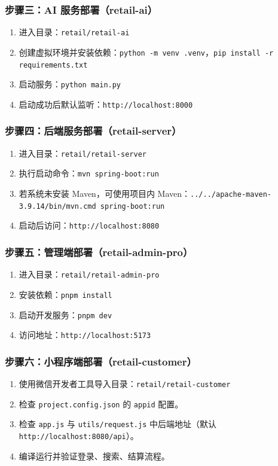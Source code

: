 \subsubsection{步骤三：AI 服务部署（retail-ai）}
\begin{enumerate}[leftmargin=2em]
  \item 进入目录：\texttt{retail/retail-ai}
  \item 创建虚拟环境并安装依赖：\texttt{python -m venv .venv}，\texttt{pip install -r requirements.txt}
  \item 启动服务：\texttt{python main.py}
  \item 启动成功后默认监听：\texttt{http://localhost:8000}
\end{enumerate}

\subsubsection{步骤四：后端服务部署（retail-server）}
\begin{enumerate}[leftmargin=2em]
  \item 进入目录：\texttt{retail/retail-server}
  \item 执行启动命令：\texttt{mvn spring-boot:run}
  \item 若系统未安装 Maven，可使用项目内 Maven：\texttt{../../apache-maven-3.9.14/bin/mvn.cmd spring-boot:run}
  \item 启动后访问：\texttt{http://localhost:8080}
\end{enumerate}

\subsubsection{步骤五：管理端部署（retail-admin-pro）}
\begin{enumerate}[leftmargin=2em]
  \item 进入目录：\texttt{retail/retail-admin-pro}
  \item 安装依赖：\texttt{pnpm install}
  \item 启动开发服务：\texttt{pnpm dev}
  \item 访问地址：\texttt{http://localhost:5173}
\end{enumerate}

\subsubsection{步骤六：小程序端部署（retail-customer）}
\begin{enumerate}[leftmargin=2em]
  \item 使用微信开发者工具导入目录：\texttt{retail/retail-customer}
  \item 检查 \texttt{project.config.json} 的 \texttt{appid} 配置。
  \item 检查 \texttt{app.js} 与 \texttt{utils/request.js} 中后端地址（默认 \texttt{http://localhost:8080/api}）。
  \item 编译运行并验证登录、搜索、结算流程。
\end{enumerate}

